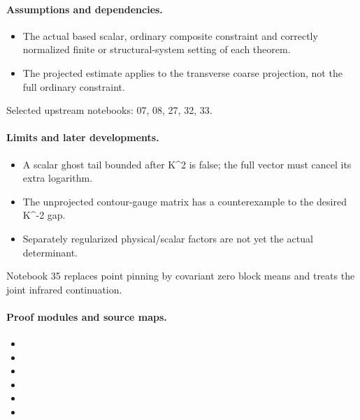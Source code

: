 \paragraph{Assumptions and dependencies.}
\begin{itemize}
\item The actual based scalar, ordinary composite constraint and correctly normalized finite or structural-system setting of each theorem.
\item The projected estimate applies to the transverse coarse projection, not the full ordinary constraint.
\end{itemize}

Selected upstream notebooks: 07, 08, 27, 32, 33.\par

\paragraph{Limits and later developments.}
\begin{itemize}
\item A scalar ghost tail bounded after K\textasciicircum{}2 is false; the full vector must cancel its extra logarithm.
\item The unprojected contour-gauge matrix has a counterexample to the desired K\textasciicircum{}-2 gap.
\item Separately regularized physical/scalar factors are not yet the actual determinant.
\end{itemize}

Notebook 35 replaces point pinning by covariant zero block means and treats the joint infrared continuation.

\paragraph{Proof modules and source maps.}
\begingroup\small
\begin{itemize}
\item {}
\item {}
\item {}
\item {}
\item {}
\item {}
\end{itemize}
\endgroup

